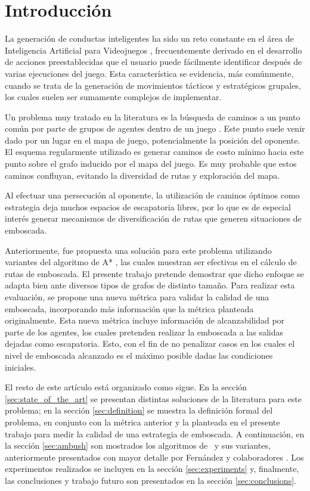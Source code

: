 \section{Introducci\'on}

La generaci\'on de conductas inteligentes ha sido un reto cons\-tan\-te
en el \'area de Inteligencia Artificial para Videojuegos \cite{MF09},
frecuentemente derivado en el desarrollo de acciones preestablecidas que
el usuario puede f\'acilmente identificar despu\'es de varias ejecuciones
del juego. Esta caracter\'istica se evidencia, m\'as com\'unmente, cuando
se trata de la generaci\'on de movimientos t\'acticos y estrat\'egicos
grupales, los cuales suelen ser sumamente complejos de implementar.

Un problema muy tratado en la literatura es la b\'usqueda de caminos
a un punto com\'un por parte de grupos de agentes dentro de un juego
\cite{MF09}. Este punto suele venir dado por un lugar en el mapa de juego,
potencialmente la posici\'on del oponente. El esquema regularmente utilizado
es generar caminos de costo m\'inimo \cite{HNR72} \cite{RN93}
hacia este punto sobre el grafo inducido por el mapa del juego. Es
muy pro\-ba\-ble que estos caminos confluyan, evitando la diversidad de
rutas y exploraci\'on del mapa.

Al efectuar una persecuci\'on al oponente, la utilizaci\'on de caminos
\'optimos como estrategia deja muchos espacios de escapatoria libres,
por lo que es de especial inter\'es generar mecanismos de diversificaci\'on de
rutas que generen situaciones de emboscada.

Anteriormente, fue propuesta una soluci\'on para este pro\-ble\-ma utilizando
variantes del algoritmo de A* \cite{FGC12e}\cite{FGC12}, las cuales
muestran ser efectivas en el c\'alculo de rutas de emboscada.
El presente trabajo pretende demostrar que dicho enfoque se adapta bien
ante diversos tipos de grafos de distinto tamaño.
Para realizar esta evaluaci\'on, se propone una nueva m\'etrica para validar
la calidad de una emboscada, incorporando m\'as informaci\'on que la m\'etrica
planteada originalmente. Esta nueva m\'etrica incluye informaci\'on de
alcanzabilidad por parte de los agentes, los cuales pretenden realizar la
emboscada a las salidas dejadas como escapatoria. Esto, con el fin de no
penalizar casos en los cuales el nivel de emboscada alcanzado es el m\'aximo
posible dadas las condiciones iniciales.

El resto de este art\'iculo est\'a organizado como sigue.
En la secci\'on \ref{sec:state_of_the_art} se presentan distintas soluciones
de la literatura para este problema; en la secci\'on \ref{sec:definition}
se muestra la definici\'on formal del problema, en conjunto con la m\'etrica
anterior y la planteada en el presente trabajo para medir la calidad de una
estrategia de emboscada. A continuaci\'on, en la secci\'on \ref{sec:ambush}
son mostrados los algoritmos de \ambush\ y sus variantes, anteriormente
presentados con mayor detalle por Fern\'andez y colaboradores
\cite{FGC12e}\cite{FGC12}. Los ex\-pe\-ri\-men\-tos realizados se incluyen en
la secci\'on \ref{sec:experiments} y, finalmente, las conclusiones y trabajo
futuro son presentados en la secci\'on \ref{sec:conclusions}.
